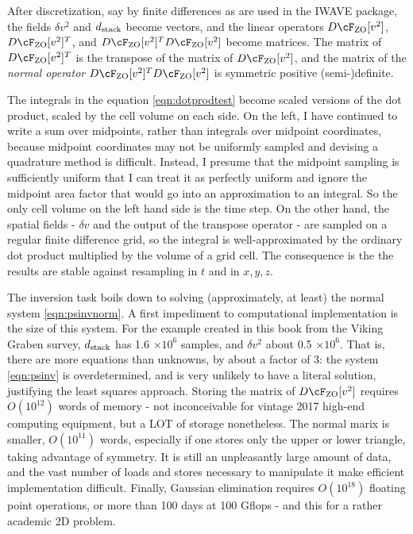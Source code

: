 After discretization, say by finite differences as are used in the IWAVE package, the fields $\delta v^2$ and $d_{\rm stack}$ become vectors, and the linear operators $D\cF_{\rm ZO}[v^2]$, $D\cF_{\rm ZO}[v^2]^T$, and $D\cF_{\rm ZO}[v^2]^TD\cF_{\rm ZO}[v^2]$ become matrices. 
The matrix of $D\cF_{\rm ZO}[v^2]^T$ is the transpose of the matrix of $D\cF_{\rm ZO}[v^2]$, and the matrix of the {\em normal operator} $D\cF_{\rm ZO}[v^2]^TD\cF_{\rm ZO}[v^2]$ is symmetric positive (semi-)definite.

The integrals in the equation \ref{eqn:dotprodtest} become scaled versions of the dot product, scaled by the cell volume on each side. On the left, I have continued to write a sum over midpoints, rather than integrals over midpoint coordinates, because midpoint coordinates may not be uniformly sampled and devising a quadrature method is difficult. Instead, I presume that the midpoint sampling is sufficiently uniform that I can treat it as perfectly uniform and ignore the midpoint area factor that would go into an approximation to an integral. So the only cell volume on the left hand side is the time step. On the other hand, the spatial fields - $\delta v$ and the output of the transpose operator - are sampled on a regular finite difference grid, so the integral is well-approximated by the ordinary dot product multiplied by the volume of a grid cell. The consequence is the the results are stable against resampling in $t$ and in $x,y,z$.

The inversion task boils down to solving (approximately, at least) the normal system \ref{eqn:psinvnorm}. A first impediment to computational implementation is the size of this system. For the example created in this book from the Viking Graben survey, $d_{\rm stack}$ has 1.6 $\times 10^6$ samples, and $\delta v^2$ about 0.5 $\times 10^6$. That is, there are more equations than unknowns, by about a factor of 3: the system \ref{eqn:psinv} is overdetermined, and is very unlikely to have a literal solution, justifying the least squares approach. Storing the matrix of $D\cF_{\rm ZO}[v^2]$ requires $O(10^{12})$ words of memory - not inconceivable for vintage 2017 high-end computing equipment, but a LOT of storage nonetheless. The normal marix is smaller, $O(10^{11})$ words, especially if one stores only the upper or lower triangle, taking advantage of symmetry. It is still an unpleasantly large amount of data, and the vast number of loads and stores necessary to manipulate it make efficient implementation difficult. Finally, Gaussian elimination requires $O(10^{18})$ floating point operations, or more than 100 days at 100 Gflops - and this for a rather academic 2D problem. 

